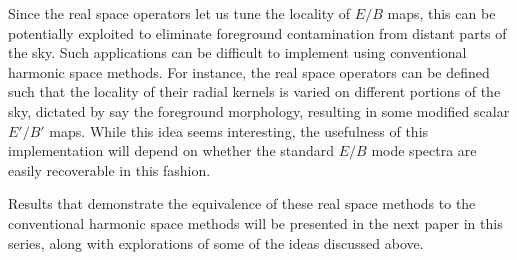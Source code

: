   

Since the real space operators let us tune the locality of $E/B$ maps, this can be potentially exploited to eliminate foreground contamination from distant parts of the sky. Such applications can be difficult to implement using conventional harmonic space methods.  For instance, the real space operators can be defined such that the locality of their radial kernels is varied on different portions of the sky, dictated by say the foreground morphology, resulting in some modified scalar $E'/B'$ maps.  While this idea seems interesting, the usefulness of this implementation will depend on whether the standard $E/B$ mode spectra are easily recoverable in this fashion.  

Results that demonstrate the equivalence of these real space methods to the conventional harmonic space methods will be presented in the next paper in this series, along with explorations of some of the ideas discussed above.

 
 

 
